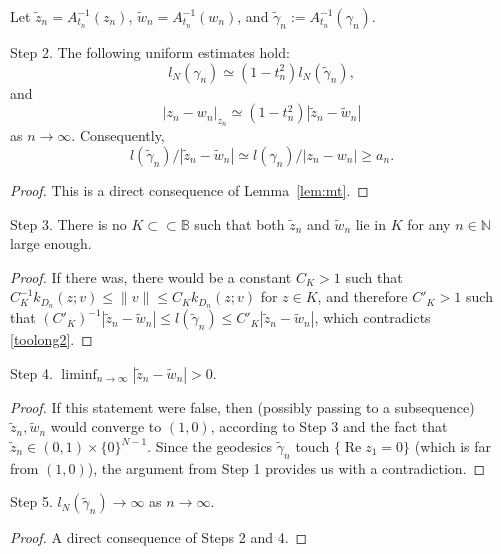 \documentclass[a4paper,12pt]{amsart}
\def\re{\operatorname{Re}}
\theoremstyle{remark}\newtheorem{remark}[theorem]{Remark}
\begin{document}
Let $\tilde z_n = A_{t_n}^{-1}(z_n)$,  $\tilde w_n=A_{t_n}^{-1}(w_n)$, and $\tilde \gamma_n := A^{-1}_{t_n} (\gamma_n)$.

\bigskip

{Step 2}. The following uniform estimates hold:
$$l_N(\gamma_n)\simeq (1-t_n^2) l_N(\tilde \gamma_n),
$$ and $$|z_n - w_n|_{z_n} \simeq (1-t_n^2) |\tilde z_n - \tilde w_n|$$ as $n \to \infty$. Consequently, 
\begin{equation}
\label{toolong2}
    l( \tilde \gamma_n)/|\tilde z_n - \tilde w_n |\simeq l (\gamma_n)/|z_n - w_n|\geq a_n.
\end{equation}

\begin{proof}
This is a direct consequence of Lemma~\ref{lem:mt}.
\end{proof}

{Step 3}. There is no $K\subset \subset \mathbb B$ such that both $\tilde z_n$ and $\tilde w_n$ lie in $K$ for any $n\in \mathbb N$ large enough.

\begin{proof}
If there was, there would be a constant $C_K>1$ such that
$C_K^{-1} k_{D_n}(z;v) \le \|v\| \le C_K k_{D_n}(z;v)$ for $z\in K$,
and therefore $C'_K>1$ such that
$(C'_K)^{-1} |\tilde z_n - \tilde w_n | \le  l( \tilde \gamma_n)
\le C'_K |\tilde z_n - \tilde w_n |$, which contradicts 
\eqref{toolong2}.
\end{proof}
 

{Step 4}. $\liminf_{n\to \infty}|\tilde z_n- \tilde w_n|>0$.

\begin{proof} If this statement were false, then (possibly passing to a subsequence) $\tilde z_n,\tilde w_n$ would converge to $(1,0)$, according to Step 3 and the fact that $\tilde z_n\in (0,1)\times \{0\}^{N-1}$. Since the geodesics $\tilde \gamma_n$ touch $\{\re z_1=0\}$ (which is far from $(1,0)$), the argument from Step 1 provides us with a contradiction.
\end{proof}

{Step 5}. $l_N(\tilde \gamma_n)\to \infty$ as $n\to \infty$. 

\begin{proof}
A direct consequence of Steps 2 and 4.
\end{proof}
\end{document}

